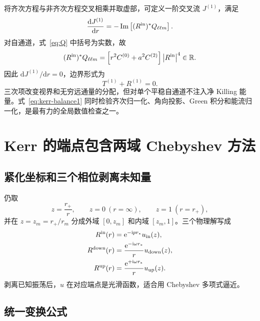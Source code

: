 \documentclass[UTF8,a4paper,11pt]{ctexart}
\newcommand{\dd}{\mathrm d}
\newcommand{\ii}{\mathrm i}
\newcommand{\ee}{\mathrm e}
\newcommand{\abs}[1]{\left|#1\right|}
\newcommand{\Imm}{\operatorname{Im}}
\begin{document}
将齐次方程与非齐次方程交叉相乘并取虚部，可定义一阶交叉流 $J^{(1)}$，满足
\begin{equation}
\frac{\dd J^{(1)}}{\dd r}
=-\Imm\left[(R^{\rm in})^*Q_{\ell\ell m}\right].
\label{eq:cross-current}
\end{equation}
对自通道，式~\eqref{eq:Q} 中括号为实数，故
\begin{equation}
(R^{\rm in})^*Q_{\ell\ell m}
=\left[r^2C^{(0)}+a^2C^{(2)}\right]\abs{R^{\rm in}}^4
\in\mathbb R.
\end{equation}
因此 $\dd J^{(1)}/\dd r=0$，边界形式为
\begin{equation}
\boxed{T^{(1)}+R^{(1)}=0.}
\label{eq:kerr-balance1}
\end{equation}
三次项改变视界和无穷远通量的分配，但对单个平稳自通道不注入净 Killing 能量。式~\eqref{eq:kerr-balance1} 同时检验齐次归一化、角向投影、Green 积分和能流归一化，是最有力的全局数值检查之一。

\section{Kerr 的端点包含两域 Chebyshev 方法}
\label{sec:kerr-spectral}

\subsection{紧化坐标和三个相位剥离未知量}

仍取
\begin{equation}
z=\frac{r_+}{r},\qquad z=0\ (r=\infty),\qquad z=1\ (r=r_+),
\label{eq:kerr-z}
\end{equation}
并在 $z=z_m=r_+/r_m$ 分成外域 $[0,z_m]$ 和内域 $[z_m,1]$。三个物理解写成
\begin{align}
R^{\rm in}(r)&=\ee^{-\ii p r_*}u_{\rm in}(z),\\
R^{\rm down}(r)&=\frac{\ee^{-\ii\omega r_*}}{r}u_{\rm down}(z),\\
R^{\rm up}(r)&=\frac{\ee^{+\ii\omega r_*}}{r}u_{\rm up}(z).
\label{eq:kerr-peeling}
\end{align}
剥离已知振荡后，$u$ 在对应端点是光滑函数，适合用 Chebyshev 多项式逼近。

\subsection{统一变换公式}
\end{document}
